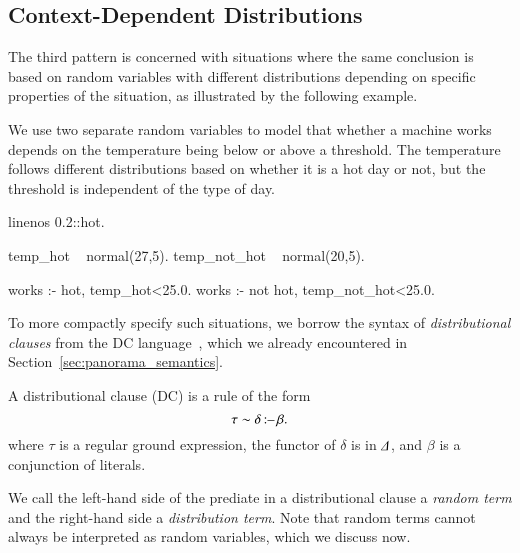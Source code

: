 \subsection{Context-Dependent Distributions}\label{sec:sugar-dc}
The third pattern is concerned with situations where the same conclusion is based on random variables with different distributions depending on specific properties of the situation, as illustrated by the following example.
\begin{example}
    We use two separate random variables to model that whether a machine works depends on the temperature being below or above a threshold. The temperature follows different distributions based on whether it is a hot day or not, but the threshold is independent of the type of day.
    \begin{problog*}{linenos}
0.2::hot.

temp_hot ~ normal(27,5).
temp_not_hot ~ normal(20,5).

works :- hot, temp_hot<25.0.
works :- not hot, temp_not_hot<25.0.
    \end{problog*}
\end{example}
To more compactly specify such situations, we borrow the syntax of \emph{distributional clauses} from the DC  language~\citep{gutmann2011magic}, which we already encountered in Section~\ref{sec:panorama_semantics}.

\begin{definition}
    A distributional clause (DC) is a rule of the form
    $$
        \tau \sim \delta \operatorname*{\mathtt{{:}{\---}}} \beta.
    $$
    where $\tau$ is a regular ground expression, the functor of $\delta$ is in ${\Delta}$, and $\beta$ is a conjunction of literals.
\end{definition}

We call the left-hand side of the  prediate in a distributional clause a {\em random term} and the right-hand side a {\em distribution term}. Note that random terms cannot always be interpreted as random variables, which we discuss now.

